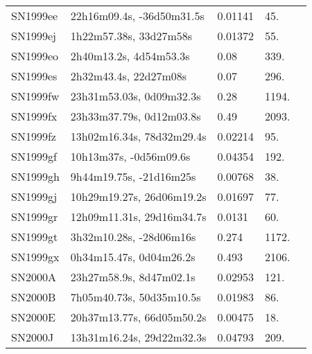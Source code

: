 \begin{longtable}{lllll}
         SN1999ee &      22h16m09.4s, -36d50m31.5s &  0.01141 &            45. &    \citet{1992ApJS...81..413M} \\
         SN1999ej &         1h22m57.38s, 33d27m58s &  0.01372 &            55. &    \citet{1999PASP..111..438F} \\
         SN1999eo &         2h40m13.2s, 4d54m53.3s &     0.08 &           339. &    \citet{1999IAUC.7297A...1S} \\
         SN1999es &          2h32m43.4s, 22d27m08s &     0.07 &           296. &    \citet{1999IAUC.7301A...1M} \\
         SN1999fw &       23h31m53.03s, 0d09m32.3s &     0.28 &          1194. &    \citet{1999IAUC.7312A...1T} \\
         SN1999fx &       23h33m37.79s, 0d12m03.8s &     0.49 &          2093. &    \citet{1999IAUC.7312A...1T} \\
         SN1999fz &      13h02m16.34s, 78d32m29.4s &  0.02214 &            95. &  \citet{1998AandAS..130..333T} \\
         SN1999gf &         10h13m37s, -0d56m09.6s &  0.04354 &           192. &  \citet{2009AandA...495..707C} \\
         SN1999gh &        9h44m19.75s, -21d16m25s &  0.00768 &            38. &    \citet{2000MNRAS.313..469S} \\
         SN1999gj &      10h29m19.27s, 26d06m19.2s &  0.01697 &            77. &  \citet{1998AandAS..130..333T} \\
         SN1999gr &      12h09m11.31s, 29d16m34.7s &   0.0131 &            60. &    \citet{1995AJ....109.1458R} \\
         SN1999gt &        3h32m10.28s, -28d06m16s &    0.274 &          1172. &    \citet{2000IAUC.7346B...1C} \\
         SN1999gx &        0h34m15.47s, 0d04m26.2s &    0.493 &          2106. &    \citet{2005IAUC.8517A...1B} \\
          SN2000A &        23h27m58.9s, 8d47m02.1s &  0.02953 &           121. &    \citet{1996AJ....111..696K} \\
          SN2000B &       7h05m40.73s, 50d35m10.5s &  0.01983 &            86. &    \citet{2000MNRAS.313..469S} \\
          SN2000E &      20h37m13.77s, 66d05m50.2s &  0.00475 &            18. &    \citet{1998AJ....115...62H} \\
          SN2000J &      13h31m16.24s, 29d22m32.3s &  0.04793 &           209. &    \citet{2001AJ....122.2893W} \\

\end{longtable}
